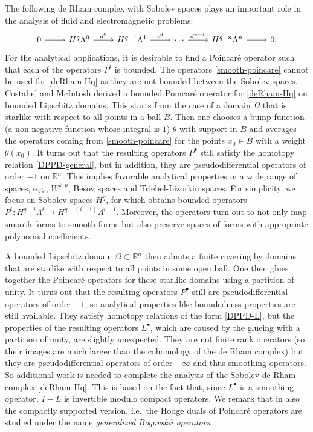 \documentclass[11pt]{amsart}
\newcommand{\0}{\mathaccent23}
\newcommand{\bs}{{\scriptscriptstyle \bullet}}
\begin{document}
The following de Rham complex with Sobolev spaces plays an important role in the analysis of fluid and electromagnetic problems:
\begin{equation}\label{deRham-Hq}
\begin{tikzcd}
0\arrow{r}& H^{q}\Lambda^{0} \arrow{r}{d^{0}}&H^{q-1}\Lambda^{1} \arrow{r}{d^{1}}&\cdots \arrow{r}{d^{n-1}}&H^{q-n}\Lambda^{n}\arrow{r}& 0. 
\end{tikzcd}
\end{equation}
For the analytical applications, it is desirable to find a Poincar\'e operator such that each of the operators $P^i$ is bounded. The operators \eqref{smooth-poincare} cannot be used for \eqref{deRham-Hq} as they are not bounded between the Sobolev spaces.
Costabel and McIntosh \cite{costabel2010bogovskiui} derived a bounded Poincar\'e operator for \eqref{deRham-Hq} on bounded Lipschitz domains. This starts from the case of a domain $\Omega$ that is starlike with respect to all points in a ball $B$. Then one chooses a bump function (a non-negative function whose integral is $1$) $\theta$ with support in $B$ and averages the operators coming from \eqref{smooth-poincare} for the points $x_0\in B$ with a weight $\theta(x_0)$. It turns out that the resulting operators $P^\bs$ still satisfy the homotopy relation \eqref{DPPD-general}, but in addition, they are pseudodifferential operators of order $-1$ on $\mathbb R^n$. This implies favorable analytical properties in a wide range of spaces, e.g.,  $W^{k, p}$, Besov spaces and Triebel-Lizorkin spaces. For simplicity, we focus on Sobolev spaces $H^q$, for which obtains bounded operators $P^{i}: H^{q-i}  \Lambda^{i}\to H^{q-(i-1)}  \Lambda^{i-1}$. Moreover, the operators turn out to not only map smooth forms to smooth forms but also preserve spaces of forms with appropriate polynomial coefficients.  

A bounded Lipschitz domain $\Omega\subset\mathbb R^n$ then admits a finite covering by domains that are starlike with respect to all points in some open ball. One then glues together the Poincar\'e operators for these starlike domains using a partition of unity. It turns out that the resulting operators $P^\bs$ still are pseudodifferential operators of order $-1$, so analytical properties like boundedness properties are still available. They satisfy homotopy relations of the form \eqref{DPPD-L}, but the properties of the resulting operators $L^\bs$, which are caused by the glueing with a partition of unity, are slightly unexpected. They are not finite rank operators (so their images are much larger than the cohomology of the de Rham complex) but they are pseudodifferential operators of order $-\infty$ and thus smoothing operators. So additional work is needed to complete the analysis of the Sobolev de Rham complex \eqref{deRham-Hq}. This is based on the fact that, since $L^\bs$ is a smoothing operator, $I-L$ is invertible modulo compact operators. We remark that in \cite{costabel2010bogovskiui} also the compactly supported version, i.e.\ the Hodge duals of Poincar\'e operators are studied under the name {\it generalized Bogovski{\u\i} operators}. 
\end{document}
